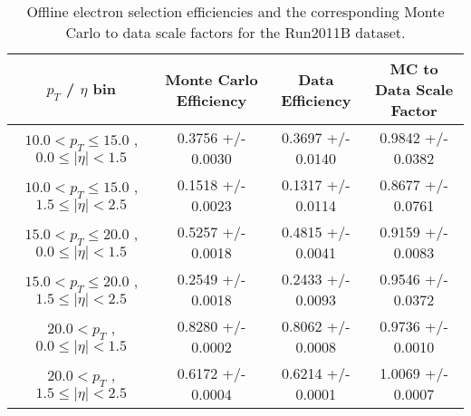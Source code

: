  \begin{table}[!ht]
 \begin{center} 
 \begin{tabular}{|c|c|c|c|}
 \hline
 $p_{T}$ / $\eta$ bin    &  Monte Carlo Efficiency    &  Data Efficiency   &  MC to Data Scale Factor \\   \hline           
$ 10.0 < p_{T} \le  15.0$ , $  0.0  \le |\eta| <   1.5$   &       0.3756 +/- 0.0030   &       0.3697 +/- 0.0140   &       0.9842 +/- 0.0382   \\   
\hline
$ 10.0 < p_{T} \le  15.0$ , $  1.5  \le |\eta| <   2.5$   &       0.1518 +/- 0.0023   &       0.1317 +/- 0.0114   &       0.8677 +/- 0.0761   \\   
\hline
$ 15.0 < p_{T} \le  20.0$ , $  0.0  \le |\eta| <   1.5$   &       0.5257 +/- 0.0018   &       0.4815 +/- 0.0041   &       0.9159 +/- 0.0083   \\   
\hline
$ 15.0 < p_{T} \le  20.0$ , $  1.5  \le |\eta| <   2.5$   &       0.2549 +/- 0.0018   &       0.2433 +/- 0.0093   &       0.9546 +/- 0.0372   \\   
\hline
$ 20.0 < p_{T} $ , $  0.0  \le |\eta| <   1.5$   &       0.8280 +/- 0.0002   &       0.8062 +/- 0.0008   &       0.9736 +/- 0.0010   \\   
\hline
$ 20.0 < p_{T} $ , $  1.5  \le |\eta| <   2.5$   &       0.6172 +/- 0.0004   &       0.6214 +/- 0.0001   &       1.0069 +/- 0.0007   \\   
\hline
\end{tabular}
\caption{Offline electron selection efficiencies and the corresponding Monte Carlo to data scale factors for the
Run2011B dataset.} 
\label{tab:eff_ele_offline_Run2011B}
\end{center}
\end{table}

